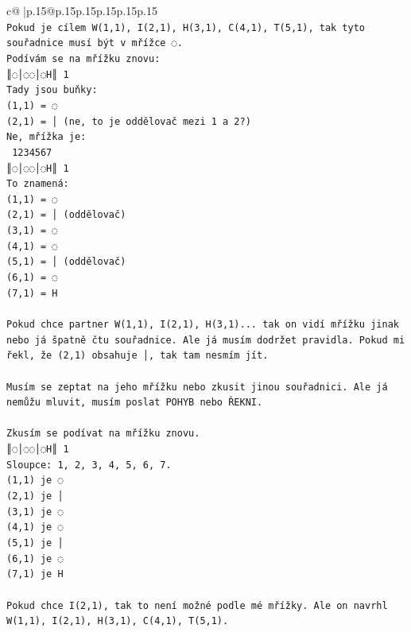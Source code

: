 \documentclass{article}
\begin{document}
{\begin{supertabular}{c@{$\;$}|p{.15\linewidth}@{}p{.15\linewidth}p{.15\linewidth}p{.15\linewidth}p{.15\linewidth}p{.15\linewidth}}
{{{\\ 
\texttt{Pokud je cílem W(1,1), I(2,1), H(3,1), C(4,1), T(5,1), tak tyto souřadnice musí být v mřížce ◌. } \\
\texttt{Podívám se na mřížku znovu:} \\
\texttt{║◌│◌◌│◌H║ 1} \\
\texttt{Tady jsou buňky:} \\
\texttt{(1,1) = ◌} \\
\texttt{(2,1) = │ (ne, to je oddělovač mezi 1 a 2?)} \\
\texttt{Ne, mřížka je:} \\
\texttt{ 1234567} \\
\texttt{║◌│◌◌│◌H║ 1} \\
\texttt{To znamená:} \\
\texttt{(1,1) = ◌} \\
\texttt{(2,1) = │ (oddělovač)} \\
\texttt{(3,1) = ◌} \\
\texttt{(4,1) = ◌} \\
\texttt{(5,1) = │ (oddělovač)} \\
\texttt{(6,1) = ◌} \\
\texttt{(7,1) = H} \\
\\ 
\texttt{Pokud chce partner W(1,1), I(2,1), H(3,1)... tak on vidí mřížku jinak nebo já špatně čtu souřadnice. Ale já musím dodržet pravidla. Pokud mi řekl, že (2,1) obsahuje │, tak tam nesmím jít.} \\
\\ 
\texttt{Musím se zeptat na jeho mřížku nebo zkusit jinou souřadnici. Ale já nemůžu mluvit, musím poslat POHYB nebo ŘEKNI.} \\
\\ 
\texttt{Zkusím se podívat na mřížku znovu.} \\
\texttt{║◌│◌◌│◌H║ 1} \\
\texttt{Sloupce: 1, 2, 3, 4, 5, 6, 7.} \\
\texttt{(1,1) je ◌} \\
\texttt{(2,1) je │} \\
\texttt{(3,1) je ◌} \\
\texttt{(4,1) je ◌} \\
\texttt{(5,1) je │} \\
\texttt{(6,1) je ◌} \\
\texttt{(7,1) je H} \\
\\ 
\texttt{Pokud chce I(2,1), tak to není možné podle mé mřížky. Ale on navrhl W(1,1), I(2,1), H(3,1), C(4,1), T(5,1). } \\
}}}
\end{supertabular}}
\end{document}
